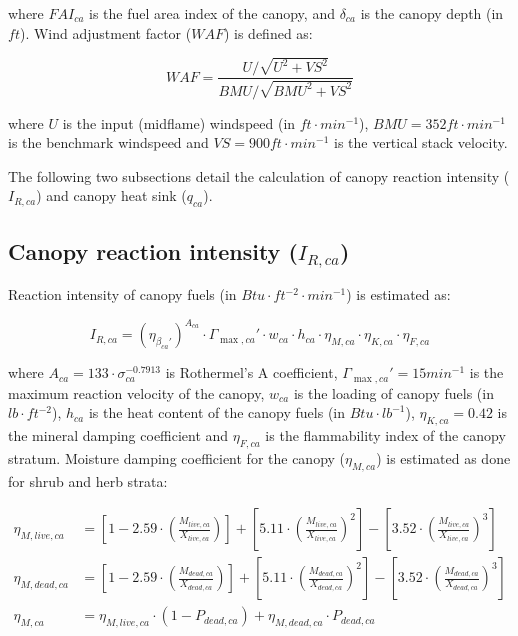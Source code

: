 \documentclass[]{book}
\begin{document}
where \(FAI_{ca}\) is the fuel area index of the canopy, and
\(\delta_{ca}\) is the canopy depth (in \(ft\)). Wind adjustment factor
(\(WAF\)) is defined as:

\begin{equation}
WAF = \frac{U/\sqrt{U^2+VS^2}}{BMU/\sqrt{BMU^2+VS^2}}
\end{equation}

where \(U\) is the input (midflame) windspeed (in
\(ft \cdot min^{-1}\)), \(BMU = 352 ft \cdot min^{-1}\) is the benchmark
windspeed and \(VS = 900 ft \cdot min^{-1}\) is the vertical stack
velocity.

The following two subsections detail the calculation of canopy reaction
intensity (\(I_{R, ca}\)) and canopy heat sink (\(q_{ca}\)).

\subsection{\texorpdfstring{Canopy reaction intensity
(\(I_{R, ca}\))}{Canopy reaction intensity (I\_\{R, ca\})}}\label{canopy-reaction-intensity-i_r-ca}

Reaction intensity of canopy fuels (in
\(Btu \cdot ft^{-2} \cdot min^{-1}\)) is estimated as:

\begin{equation}
I_{R,ca} = (\eta_{\beta_{ca}'})^{A_{ca}}\cdot \Gamma_{\max, ca}'\cdot w_{ca} \cdot h_{ca} \cdot \eta_{M,ca}\cdot \eta_{K,ca}\cdot \eta_{F,ca}
\end{equation}

where \(A_{ca} = 133\cdot \sigma_{ca}^{-0.7913}\) is Rothermel's A
coefficient, \(\Gamma_{\max, ca}' = 15 min^{-1}\) is the maximum
reaction velocity of the canopy, \(w_{ca}\) is the loading of canopy
fuels (in \(lb \cdot ft^{-2}\)), \(h_{ca}\) is the heat content of the
canopy fuels (in \(Btu \cdot lb^{-1}\)), \(\eta_{K,ca}=0.42\) is the
mineral damping coefficient and \(\eta_{F,ca}\) is the flammability
index of the canopy stratum. Moisture damping coefficient for the canopy
(\(\eta_{M,ca}\)) is estimated as done for shrub and herb strata:

\begin{eqnarray}
\eta_{M, live, ca} &= \left[1-2.59\cdot \left(\frac{M_{live, ca}}{X_{live, ca}}\right)\right] +\left[ 5.11\cdot \left(\frac{M_{live, ca}}{X_{live, ca}}\right)^2\right]-\left[ 3.52\cdot \left(\frac{M_{live, ca}}{X_{live, ca}}\right)^3\right] \\
\eta_{M, dead, ca} &= \left[1-2.59\cdot \left(\frac{M_{dead, ca}}{X_{dead, ca}}\right)\right] +\left[ 5.11\cdot \left(\frac{M_{dead, ca}}{X_{dead, ca}}\right)^2\right]-\left[ 3.52\cdot \left(\frac{M_{dead, ca}}{X_{dead, ca}}\right)^3\right] \\
\eta_{M, ca} &= \eta_{M, live, ca} \cdot (1 - P_{dead, ca})+ \eta_{M, dead, ca} \cdot P_{dead, ca}
\end{eqnarray}
\end{document}
